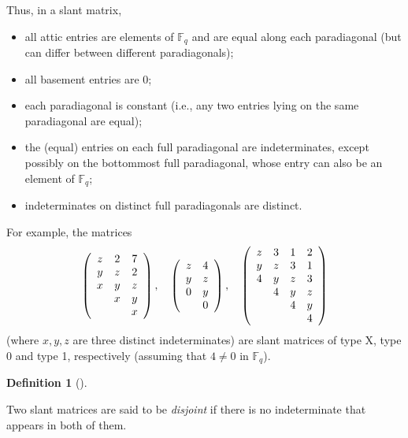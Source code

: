 \documentclass[numbers=enddot,12pt,final,onecolumn,notitlepage]{scrartcl}%
\theoremstyle{definition}
\newtheorem{defi}[theo]{Definition}
\newenvironment{definition}[1][]
{\begin{defi}[#1]\begin{leftbar}}
{\end{leftbar}\end{defi}}
\newcommand{\Fq}{\mathbb{F}_q}
\theoremstyle{plainsl}
\begin{document}
Thus, in a slant matrix,

\begin{itemize}
\item all attic entries are elements of $\Fq$ and are equal along each
paradiagonal (but can differ between different paradiagonals);

\item all basement entries are $0$;

\item each paradiagonal is constant (i.e., any two entries lying on the same
paradiagonal are equal);

\item the (equal) entries on each full paradiagonal are indeterminates, except
possibly on the bottommost full paradiagonal, whose entry can also be an
element of $\Fq$;

\item indeterminates on distinct full paradiagonals are distinct.
\end{itemize}

For example, the matrices%
\[
\left(
\begin{array}
[c]{ccc}%
z & 2 & 7\\
y & z & 2\\
x & y & z\\
& x & y\\
&  & x
\end{array}
\right)  ,\ \ \ \left(
\begin{array}
[c]{cc}%
z & 4\\
y & z\\
0 & y\\
& 0
\end{array}
\right)  ,\ \ \ \left(
\begin{array}
[c]{cccc}%
z & 3 & 1 & 2\\
y & z & 3 & 1\\
4 & y & z & 3\\
& 4 & y & z\\
&  & 4 & y\\
&  &  & 4
\end{array}
\right)
\]
(where $x,y,z$ are three distinct indeterminates) are slant matrices of type
X, type 0 and type 1, respectively (assuming that $4\neq0$ in $\Fq$).

\begin{definition}
Two slant matrices are said to be \emph{disjoint} if there is no indeterminate
that appears in both of them.
\end{definition}
\end{document}
